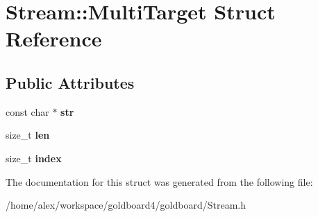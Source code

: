 \hypertarget{struct_stream_1_1_multi_target}{}\section{Stream\+:\+:Multi\+Target Struct Reference}
\label{struct_stream_1_1_multi_target}
\subsection*{Public Attributes}
\begin{DoxyCompactItemize}
\item 
const char $\ast$ {\bfseries str}\hypertarget{struct_stream_1_1_multi_target_a2966d33f06cd1f5db43702f08c6e74c7}{}\label{struct_stream_1_1_multi_target_a2966d33f06cd1f5db43702f08c6e74c7}

\item 
size\+\_\+t {\bfseries len}\hypertarget{struct_stream_1_1_multi_target_ae0ffba42be1143525f624242bf607a63}{}\label{struct_stream_1_1_multi_target_ae0ffba42be1143525f624242bf607a63}

\item 
size\+\_\+t {\bfseries index}\hypertarget{struct_stream_1_1_multi_target_a33cced896eb2dbabbeb7dd5dfa019e51}{}\label{struct_stream_1_1_multi_target_a33cced896eb2dbabbeb7dd5dfa019e51}

\end{DoxyCompactItemize}


The documentation for this struct was generated from the following file\+:\begin{DoxyCompactItemize}
\item 
/home/alex/workspace/goldboard4/goldboard/Stream.\+h\end{DoxyCompactItemize}
